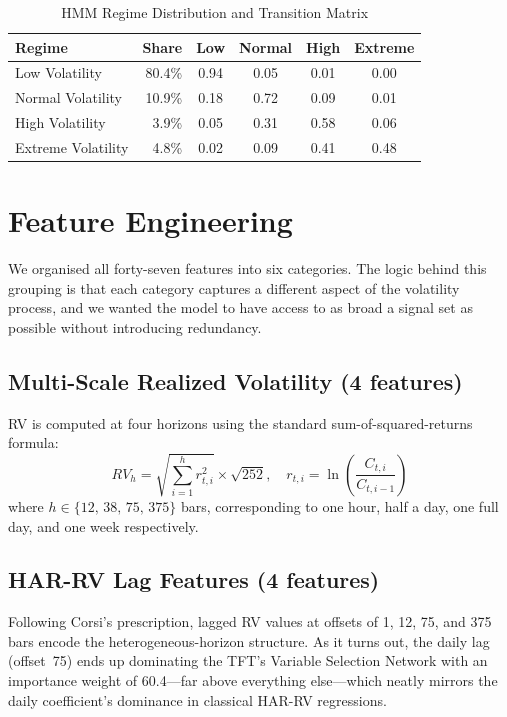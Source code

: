 \begin{table}[h!]
\caption{HMM Regime Distribution and Transition Matrix}
\label{tab:regdist}
\centering
\scriptsize
\begin{tabular}{lrcccc}
\hline
\textbf{Regime} & \textbf{Share} & \textbf{Low} & \textbf{Normal} & \textbf{High} & \textbf{Extreme} \\
\hline
Low Volatility & 80.4\% & 0.94 & 0.05 & 0.01 & 0.00 \\
Normal Volatility & 10.9\% & 0.18 & 0.72 & 0.09 & 0.01 \\
High Volatility & 3.9\% & 0.05 & 0.31 & 0.58 & 0.06 \\
Extreme Volatility & 4.8\% & 0.02 & 0.09 & 0.41 & 0.48 \\
\hline
\end{tabular}
\end{table}

\section{Feature Engineering}

We organised all forty-seven features into six categories. The logic behind this grouping is that each category captures a different aspect of the volatility process, and we wanted the model to have access to as broad a signal set as possible without introducing redundancy.

\subsection{Multi-Scale Realized Volatility (4 features)}

RV is computed at four horizons using the standard sum-of-squared-returns formula:
\begin{equation}
RV_h = \sqrt{\sum_{i=1}^{h} r_{t,i}^2} \times \sqrt{252}, \quad r_{t,i}=\ln\!\left(\frac{C_{t,i}}{C_{t,i-1}}\right)
\end{equation}
where $h \in \{12,\,38,\,75,\,375\}$ bars, corresponding to one hour, half a day, one full day, and one week respectively.

\subsection{HAR-RV Lag Features (4 features)}

Following Corsi's prescription, lagged RV values at offsets of 1, 12, 75, and 375 bars encode the heterogeneous-horizon structure. As it turns out, the daily lag (offset~75) ends up dominating the TFT's Variable Selection Network with an importance weight of 60.4---far above everything else---which neatly mirrors the daily coefficient's dominance in classical HAR-RV regressions.

